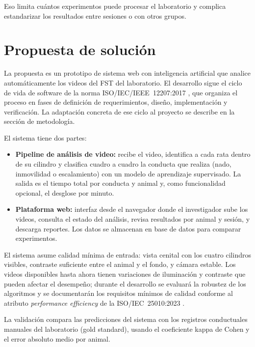 Eso limita cuántos experimentos puede procesar el laboratorio y complica estandarizar
los resultados entre sesiones o con otros grupos.

\section{Propuesta de solución}

La propuesta es un prototipo de sistema web con inteligencia artificial que analice
automáticamente los videos del FST del laboratorio. El desarrollo sigue el ciclo de
vida de software de la norma ISO/IEC/IEEE~12207:2017 \cite{iso12207}, que organiza el
proceso en fases de definición de requerimientos, diseño, implementación y verificación.
La adaptación concreta de ese ciclo al proyecto se describe en la sección de
metodología.

El sistema tiene dos partes:

\begin{itemize}
  \item \textbf{Pipeline de análisis de video:} recibe el video, identifica a cada rata
        dentro de su cilindro y clasifica cuadro a cuadro la conducta que realiza (nado,
        inmovilidad o escalamiento) con un modelo de aprendizaje supervisado. La salida
        es el tiempo total por conducta y animal y, como funcionalidad opcional, el
        desglose por minuto.
  \item \textbf{Plataforma web:} interfaz desde el navegador donde el investigador sube
        los videos, consulta el estado del análisis, revisa resultados por animal y
        sesión, y descarga reportes. Los datos se almacenan en base de datos para
        comparar experimentos.
\end{itemize}

El sistema asume calidad mínima de entrada: vista cenital con los cuatro cilindros
visibles, contraste suficiente entre el animal y el fondo, y cámara estable. Los videos
disponibles hasta ahora tienen variaciones de iluminación y contraste que pueden afectar
el desempeño; durante el desarrollo se evaluará la robustez de los algoritmos y se
documentarán los requisitos mínimos de calidad conforme al atributo \textit{performance
efficiency} de la ISO/IEC~25010:2023 \cite{iso25010}.

La validación compara las predicciones del sistema con los registros conductuales
manuales del laboratorio (gold standard), usando el coeficiente kappa de Cohen y el
error absoluto medio por animal.

